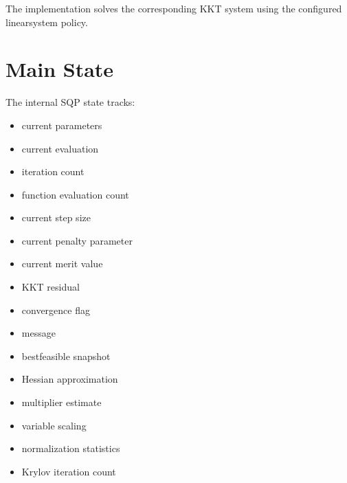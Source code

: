 \documentclass[letterpaper,10pt,english]{sphinxmanual}
\begin{document}
\sphinxAtStartPar
The implementation solves the corresponding KKT system using the configured linear\sphinxhyphen{}system policy.


\section{Main State}
\label{\detokenize{optima_sequential_qp:main-state}}
\sphinxAtStartPar
The internal SQP state tracks:
\begin{itemize}
\item {} 
\sphinxAtStartPar
current parameters

\item {} 
\sphinxAtStartPar
current evaluation

\item {} 
\sphinxAtStartPar
iteration count

\item {} 
\sphinxAtStartPar
function evaluation count

\item {} 
\sphinxAtStartPar
current step size

\item {} 
\sphinxAtStartPar
current penalty parameter

\item {} 
\sphinxAtStartPar
current merit value

\item {} 
\sphinxAtStartPar
KKT residual

\item {} 
\sphinxAtStartPar
convergence flag

\item {} 
\sphinxAtStartPar
message

\item {} 
\sphinxAtStartPar
best\sphinxhyphen{}feasible snapshot

\item {} 
\sphinxAtStartPar
Hessian approximation

\item {} 
\sphinxAtStartPar
multiplier estimate

\item {} 
\sphinxAtStartPar
variable scaling

\item {} 
\sphinxAtStartPar
normalization statistics

\item {} 
\sphinxAtStartPar
Krylov iteration count

\end{itemize}
\end{document}
